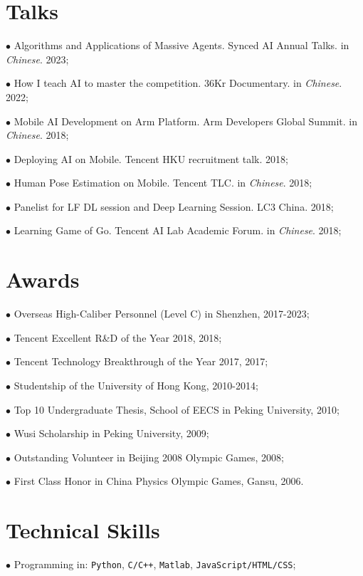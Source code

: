 \documentclass[10pt]{article}
\renewcommand{\section}[2]%
        {\pagebreak[2]\vspace{1.3\baselineskip}%
         \phantomsection\addcontentsline{toc}{section}{#1}%
         \hspace{0in}%
         \marginpar{
         \raggedright \scshape #1}#2}
\begin{document}

\section{Talks}
$\bullet$ Algorithms and Applications of Massive Agents. Synced AI Annual Talks. in \textit{Chinese}. 2023; 

$\bullet$ How I teach AI to master the competition. 36Kr Documentary. in \textit{Chinese}. 2022; 
    
$\bullet$ Mobile AI Development on Arm Platform. Arm Developers Global Summit. in \textit{Chinese}. 2018;

$\bullet$ Deploying AI on Mobile. Tencent HKU recruitment talk. 2018;

$\bullet$ Human Pose Estimation on Mobile. Tencent TLC. in \textit{Chinese}. 2018;

$\bullet$ Panelist for LF DL session and Deep Learning Session. LC3 China. 2018;

$\bullet$ Learning Game of Go. Tencent AI Lab Academic Forum. in \textit{Chinese}. 2018;


\section{Awards}
$\bullet$ Overseas High-Caliber Personnel (Level C) in Shenzhen, 2017-2023;

$\bullet$ Tencent Excellent R\&D of the Year 2018, 2018;

$\bullet$ Tencent Technology Breakthrough of the Year 2017, 2017;

$\bullet$ Studentship of the University of Hong Kong, 2010-2014;

$\bullet$ Top 10 Undergraduate Thesis, School of EECS in Peking University, 2010;

$\bullet$ Wusi Scholarship in Peking University, 2009;

$\bullet$ Outstanding Volunteer in Beijing 2008 Olympic Games, 2008;

$\bullet$ First Class Honor in China Physics Olympic Games, Gansu, 2006.


\section{Technical Skills}
$\bullet$ Programming in: \texttt{Python}, \texttt{C/C++}, \texttt{Matlab}, \texttt{JavaScript/HTML/CSS};
\end{document}
